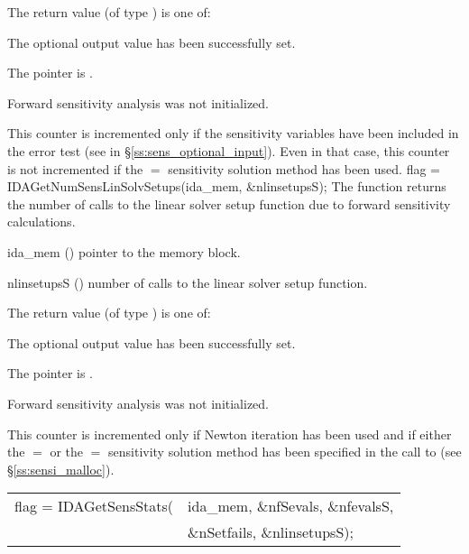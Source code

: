 {
  The return value  (of type ) is one of:
  \begin{args}
  \item[\Id{IDA\_SUCCESS}] 
    The optional output value has been successfully set.
  \item[\Id{IDA\_MEM\_NULL}]
    The  pointer is .
  \item[\Id{IDA\_NO\_SENS}]
    Forward sensitivity analysis was not initialized.
  \end{args}
}
{
  This counter is incremented only if the sensitivity variables have been included
  in the error test (see  in \S\ref{ss:sens_optional_input}). 
  Even in that case, this counter is not incremented if the $=$ 
  sensitivity solution method has been used.
}
{
  flag = IDAGetNumSensLinSolvSetups(ida\_mem, \&nlinsetupsS);
}
{
  The function  returns the number of calls
  to the linear solver setup function due to forward sensitivity calculations.
}
{
  \begin{args}
  \item[ida\_mem] ()
    pointer to the {\idas} memory block.
  \item[nlinsetupsS] ()
    number of calls to the linear solver setup function.
  \end{args}
}
{
  The return value  (of type ) is one of:
  \begin{args}
  \item[\Id{IDA\_SUCCESS}] 
    The optional output value has been successfully set.
  \item[\Id{IDA\_MEM\_NULL}]
    The  pointer is .
  \item[\Id{IDA\_NO\_SENS}]
    Forward sensitivity analysis was not initialized.
  \end{args}
}
{
  This counter is incremented only if Newton iteration has been used and if
  either the $=$ or the $=$ sensitivity
  solution method has been specified in the call to 
  (see \S\ref{ss:sensi_malloc}).
}
{
  \begin{tabular}[t]{@{}r@{}l@{}}
    flag = IDAGetSensStats(&ida\_mem, \&nfSevals, \&nfevalsS, \\
                             &\&nSetfails, \&nlinsetupsS);
  \end{tabular}
}
